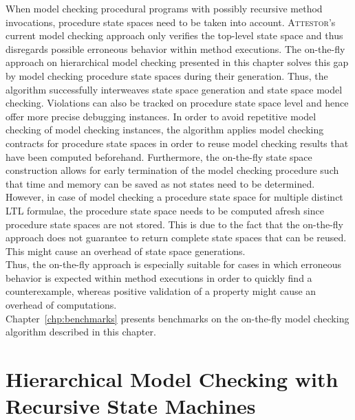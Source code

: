 \documentclass[a4paper, 12pt, twoside]{report}
\begin{document}
	When model checking procedural programs with possibly recursive method invocations, procedure state spaces need to be taken into account. \textsc{Attestor}'s current model checking approach only verifies the top-level state space and thus disregards possible erroneous behavior within method executions. The on-the-fly approach on hierarchical model checking presented in this chapter solves this gap by model checking procedure state spaces during their generation. Thus, the algorithm successfully interweaves state space generation and state space model checking. Violations can also be tracked on procedure state space level and hence offer more precise debugging instances. In order to avoid repetitive model checking of model checking instances, the algorithm applies model checking contracts for procedure state spaces in order to reuse model checking results that have been computed beforehand. Furthermore, the on-the-fly state space construction allows for early termination of the model checking procedure such that time and memory can be saved as not states need to be determined. \\
	
	However, in case of model checking a procedure state space for multiple distinct LTL formulae, the procedure state space needs to be computed afresh since procedure state spaces are not stored. This is due to the fact that the on-the-fly approach does not guarantee to return complete state spaces that can be reused. This might cause an overhead of state space generations.\\
	
	Thus, the on-the-fly approach is especially suitable for cases in which erroneous behavior is expected within method executions in order to quickly find a counterexample, whereas positive validation of a property might cause an overhead of computations. \\
	
	Chapter~\ref{chp:benchmarks} presents benchmarks on the on-the-fly model checking algorithm described in this chapter.
		
	
	
	\chapter{Hierarchical Model Checking with Recursive State Machines}\label{chp:hmc}
\end{document}
